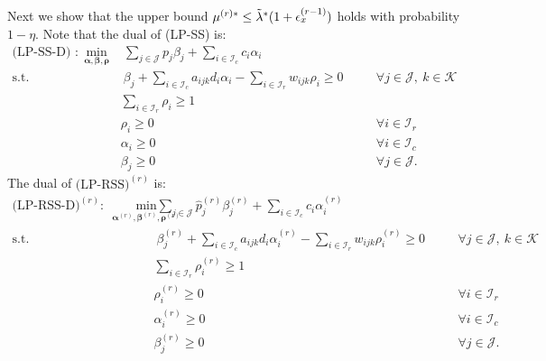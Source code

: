 \documentclass[letterpaper, 10 pt, conference]{ieeeconf}  %
\makeatletter
\renewenvironment{proof}[1][\relax]{\par
  \pushQED{\qed}%
  \normalfont \topsep6\p@\@plus6\p@\relax
  \trivlist
  \item[\hskip\labelsep\itshape
    \ifx#1\relax \proofname\else\proofname{} of #1\fi\@addpunct{.}]\ignorespaces
}{%
  \popQED\endtrivlist\@endpefalse
}
\newcommand{\III}{\mathcal{I}}
\newcommand{\JJJ}{\mathcal{J}}
\newcommand{\KKK}{\mathcal{K}}
\theoremstyle{plain}
\theoremstyle{definition}
\theoremstyle{remark}
\makeatother
\begin{document}
\begin{proof}[Lemma \ref{olem:3.3}]
Next we show that the upper bound $\mu^{(r)*} \leq \Tilde{\lambda}^*(1+ \epsilon^{(r-1)}_{x})$ holds with probability $1-\eta$. Note that the dual of (LP-SS) is:
\begin{subequations}
\begin{alignat}{2}
\text{(LP-SS-D) }: \min\limits_{\boldsymbol{\alpha}, \boldsymbol{\beta}, \boldsymbol{\rho}}  &~ \sum_{j \in \JJJ} p_j \beta_j + \sum_{i \in \III_c} c_i \alpha_i & \nonumber\\
\text{s.t.}  &~\beta_j + \sum_{i \in \III_c} a_{ijk} d_i \alpha_i - \sum_{i \in \III_r} w_{ijk} \rho_i \geq 0   &\quad &\forall j \in \JJJ, ~k \in \KKK   \nonumber\\
&\sum_{i \in \III_r} \rho_i \geq 1   & \nonumber\\
&\rho_i \geq 0   &\quad &\forall i \in \III_r \nonumber\\ 
&\alpha_i \geq 0   &\quad &\forall i \in \III_c \nonumber\\
&\beta_j \geq 0      &\quad &\forall j\in \JJJ \nonumber.
\end{alignat}
\end{subequations}
The dual of $\text{(LP-RSS)}^{(r)}$ is:
\begin{subequations}
\begin{alignat}{2}
\text{(LP-RSS-D)}^{(r)}: ~\min\limits_{\boldsymbol{\alpha}^{(r)}, \boldsymbol{\beta}^{(r)}, \boldsymbol{\rho}^{(r)}}  &~ \sum_{j \in \JJJ} \hat{p}^{(r)}_{j} \beta^{(r)}_{j} + \sum_{i \in \III_c} c_i \alpha^{(r)}_{i} & \nonumber\\
\text{s.t.}  &~\beta^{(r)}_{j} + \sum_{i \in \III_c} a_{ijk} d_i \alpha^{(r)}_{i} - \sum_{i \in \III_r} w_{ijk} \rho^{(r)}_{i} \geq 0   &\quad &\forall j \in \JJJ, ~k \in \KKK   \nonumber\\
&\sum_{i \in \III_r} \rho^{(r)}_{i} \geq 1   & \nonumber\\
&\rho^{(r)}_{i}  \geq 0   &\quad &\forall i \in \III_r \nonumber\\
&\alpha^{(r)}_{i} \geq 0   &\quad &\forall i \in \III_c \nonumber\\
&\beta^{(r)}_{j} \geq 0      &\quad &\forall j\in \JJJ \nonumber.
\end{alignat}
\end{subequations}


\end{proof}
\end{document}
